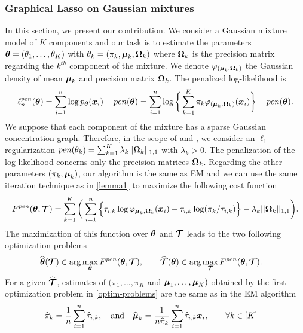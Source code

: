 \subsubsection{Graphical Lasso on Gaussian mixtures}
In this section, we present our contribution. We consider a Gaussian mixture model of $K$ components and our task is to estimate the parameters ${\boldsymbol\theta}=(\theta_1,\dots,\theta_K)$ with $\theta_k=(\pi_k, \boldsymbol\mu_k, \boldsymbol\Omega_k)$ where $\boldsymbol\Omega_k$ is the precision matrix regarding the $k^{th}$ component of the mixture. We denote $\varphi_{(\boldsymbol\mu_{k},\boldsymbol\Omega_{k})}$ the Gaussian density of mean $\boldsymbol\mu_k$ and precision matrix $\boldsymbol\Omega_k$. The penalized log-likelihood is
\begin{equation}
\label{pen-log-likelihood}
\ell_n^{pen}({\boldsymbol\theta})=\sum_{i=1}^{n}\log p_{{\boldsymbol\theta}}(\boldsymbol x_i)-pen({\boldsymbol\theta})= \sum_{i=1}^{n}\log \bigg\{ \sum_{k=1}^K\pi_k\varphi_{(\boldsymbol\mu_{k},\boldsymbol\Omega_{k})}(\boldsymbol x_i)\bigg\} -pen({\boldsymbol\theta}).
\end{equation}
We suppose that each component of the mixture has a sparse Gaussian concentration graph. Therefore, in the scope of \citep{banerjee} and \citep{glasso07}, we consider an $\ell_1$ regularization $pen(\theta_k)=\sum_{k=1}^K\lambda_k||\boldsymbol\Omega_k||_{1,1}$ with $\lambda_k >0$. The penalization of the log-likelihood concerns only the precision matrices $\boldsymbol\Omega_k$. Regarding the other parameters $(\pi_k, \boldsymbol\mu_k)$, our algorithm is the same as EM and we can use the same iteration technique as in \cref{lemma1} to maximize the following cost function
\begin{equation}
\label{cost_fun_pen}
F^{pen}({\boldsymbol\theta},\boldsymbol{\mathcal T})  = \sum_{k=1}^K \bigg(\sum_{i=1}^{n} \Big\{\tau_{i,k}\log\varphi_{\boldsymbol\mu_{k},\boldsymbol\Omega_{k}}(\boldsymbol x_i)+\tau_{i,k}
    \log(\pi_k/\tau_{i,k})\Big\}-\lambda_k||\boldsymbol\Omega_k||_{1,1}\bigg).
\end{equation}
The maximization of this function over ${\boldsymbol\theta}$ and $\boldsymbol{\mathcal T}$ leads to the two following optimization problems
\begin{align}
\label{optim-problems}
\widehat{{\boldsymbol\theta}}(\boldsymbol{\mathcal T})&\in \arg\max_{{\boldsymbol\theta}} F^{pen}({\boldsymbol\theta},\boldsymbol{\mathcal T}),\qquad \widehat{\boldsymbol{\mathcal T}}({\boldsymbol\theta})\in \arg\max_{\boldsymbol{\mathcal T}} F^{pen}({\boldsymbol\theta},\boldsymbol{\mathcal T}).
\end{align}
For a given $\widehat{\boldsymbol{\mathcal T}}$, estimates of $(\pi_1,\dots,\pi_K$ and $\boldsymbol\mu_1,\dots,\boldsymbol\mu_K)$ obtained by the first optimization problem in \cref{optim-problems} are the same as in the EM algorithm
\begin{align}
\label{em-sols}
\widehat\pi_k     &= \frac1n\sum_{i=1}^n \widehat\tau_{i,k},\quad\text{and}\quad\widehat{\boldsymbol\mu}_k = \frac1{n\widehat\pi_k}\sum_{i=1}^n \widehat\tau_{i,k}\boldsymbol x_i ,\qquad \forall k\in[K]
\end{align}
